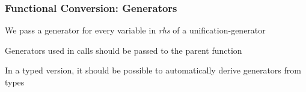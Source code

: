 \documentclass[xcolor=table, aspectratio=169]{beamer}
\begin{document}
\begin{frame}[fragile]
  \frametitle{Functional Conversion: Generators}
\begin{center}
We pass a generator for every variable in \emph{rhs} of a unification-generator
\end{center}

\begin{center}
Generators used in calls should be passed to the parent function
\end{center}

\begin{center}
In a typed version, it should be possible to automatically derive generators from types
\end{center}

    
\end{frame}
\end{document}
